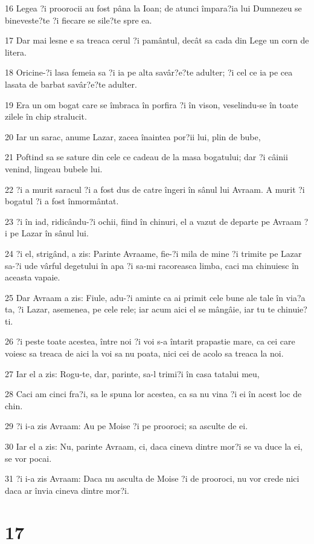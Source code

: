 \par 16 Legea ?i proorocii au fost pâna la Ioan; de atunci împara?ia lui Dumnezeu se bineveste?te ?i fiecare se sile?te spre ea.
\par 17 Dar mai lesne e sa treaca cerul ?i pamântul, decât sa cada din Lege un corn de litera.
\par 18 Oricine-?i lasa femeia sa ?i ia pe alta savâr?e?te adulter; ?i cel ce ia pe cea lasata de barbat savâr?e?te adulter.
\par 19 Era un om bogat care se îmbraca în porfira ?i în vison, veselindu-se în toate zilele în chip stralucit.
\par 20 Iar un sarac, anume Lazar, zacea înaintea por?ii lui, plin de bube,
\par 21 Poftind sa se sature din cele ce cadeau de la masa bogatului; dar ?i câinii venind, lingeau bubele lui.
\par 22 ?i a murit saracul ?i a fost dus de catre îngeri în sânul lui Avraam. A murit ?i bogatul ?i a fost înmormântat.
\par 23 ?i în iad, ridicându-?i ochii, fiind în chinuri, el a vazut de departe pe Avraam ?i pe Lazar în sânul lui.
\par 24 ?i el, strigând, a zis: Parinte Avraame, fie-?i mila de mine ?i trimite pe Lazar sa-?i ude vârful degetului în apa ?i sa-mi racoreasca limba, caci ma chinuiesc în aceasta vapaie.
\par 25 Dar Avraam a zis: Fiule, adu-?i aminte ca ai primit cele bune ale tale în via?a ta, ?i Lazar, asemenea, pe cele rele; iar acum aici el se mângâie, iar tu te chinuie?ti.
\par 26 ?i peste toate acestea, între noi ?i voi s-a întarit prapastie mare, ca cei care voiesc sa treaca de aici la voi sa nu poata, nici cei de acolo sa treaca la noi.
\par 27 Iar el a zis: Rogu-te, dar, parinte, sa-l trimi?i în casa tatalui meu,
\par 28 Caci am cinci fra?i, sa le spuna lor acestea, ca sa nu vina ?i ei în acest loc de chin.
\par 29 ?i i-a zis Avraam: Au pe Moise ?i pe prooroci; sa asculte de ei.
\par 30 Iar el a zis: Nu, parinte Avraam, ci, daca cineva dintre mor?i se va duce la ei, se vor pocai.
\par 31 ?i i-a zis Avraam: Daca nu asculta de Moise ?i de prooroci, nu vor crede nici daca ar învia cineva dintre mor?i.

\chapter{17}

